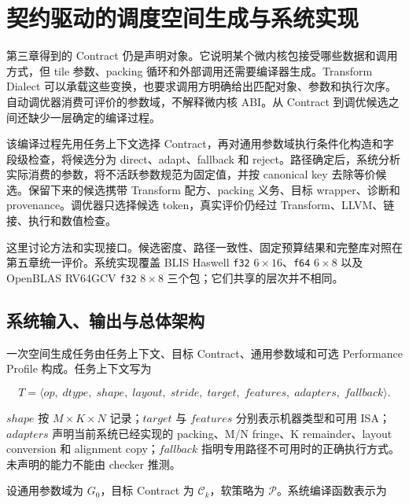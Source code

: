 
\chapter{契约驱动的调度空间生成与系统实现}
\label{chap:contract-space-system}

第三章得到的 Contract 仍是声明对象。它说明某个微内核包接受哪些数据和调用方式，但 tile 参数、packing 循环和外部调用还需要编译器生成。Transform Dialect 可以承载这些变换，也要求调用方明确给出匹配对象、参数和执行次序\cite{LLVMProjectTransformDialect,Luecke2025TransformDialect}。自动调优器消费可评价的参数域，不解释微内核 ABI\cite{Hellsten2023BaCO}。从 Contract 到调优候选之间还缺少一层确定的编译过程。

该编译过程先用任务上下文选择 Contract，再对通用参数域执行条件化构造和字段级检查，将候选分为 direct、adapt、fallback 和 reject。路径确定后，系统分析实际消费的参数，将不活跃参数规范为固定值，并按 canonical key 去除等价候选。保留下来的候选携带 Transform 配方、packing 义务、目标 wrapper、诊断和 provenance。调优器只选择候选 token，真实评价仍经过 Transform、LLVM、链接、执行和数值检查。

这里讨论方法和实现接口。候选密度、路径一致性、固定预算结果和完整库对照在第五章统一评价。系统实现覆盖 BLIS Haswell \texttt{f32} $6\times16$、\texttt{f64} $6\times8$ 以及 OpenBLAS RV64GCV \texttt{f32} $8\times8$ 三个包；它们共享的层次并不相同。

\section{系统输入、输出与总体架构}

一次空间生成任务由任务上下文、目标 Contract、通用参数域和可选 Performance Profile 构成。任务上下文写为

\begin{equation}
T=\langle
op,\;dtype,\;shape,\;layout,\;stride,\;target,\;features,\;
adapters,\;fallback
\rangle .
\label{eq:chapter4-task-context}
\end{equation}

$shape$ 按 $M\times K\times N$ 记录；$target$ 与 $features$ 分别表示机器类型和可用 ISA；$adapters$ 声明当前系统已经实现的 packing、M/N fringe、K remainder、layout conversion 和 alignment copy；$fallback$ 指明专用路径不可用时的正确执行方式。未声明的能力不能由 checker 推测。

设通用参数域为 $G_0$，目标 Contract 为 $\mathcal{C}_k$，软策略为 $\mathcal{P}$。系统编译函数表示为

